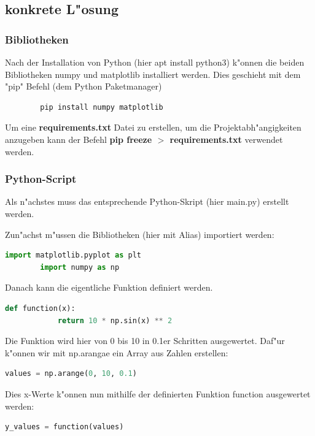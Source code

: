 \documentclass[a4paper,11pt,titlepage]{article}
\begin{document}
    \subsection{konkrete L"osung}

    \subsubsection{Bibliotheken}
    Nach der Installation von Python (hier apt install python3) k"onnen die beiden Bibliotheken numpy und matplotlib installiert werden. Dies geschieht mit dem "pip" Befehl (dem Python Paketmanager)
    \begin{lstlisting}
        pip install numpy matplotlib
    \end{lstlisting}
    Um eine \textbf{requirements.txt} Datei zu erstellen, um die Projektabh"angigkeiten anzugeben kann der Befehl \textbf{pip freeze $>$ requirements.txt} verwendet werden.

    \subsubsection{Python-Script}
    Als n"achstes muss das entsprechende Python-Skript (hier main.py) erstellt werden.

    Zun"achst m"ussen die Bibliotheken (hier mit Alias) importiert werden:
    \begin{lstlisting}[language=Python]
        import matplotlib.pyplot as plt
        import numpy as np
    \end{lstlisting}
    Danach kann die eigentliche Funktion definiert werden.
    \begin{lstlisting}[language=Python]
        def function(x):
            return 10 * np.sin(x) ** 2
    \end{lstlisting}
    Die Funktion wird hier von 0 bis 10 in 0.1er Schritten ausgewertet. Daf"ur k"onnen wir mit np.arangae ein Array aus Zahlen erstellen:
    \begin{lstlisting}[language=Python]
        values = np.arange(0, 10, 0.1)
    \end{lstlisting}
    Dies x-Werte k"onnen nun mithilfe der definierten Funktion function ausgewertet werden:
    \begin{lstlisting}[language=Python]
        y_values = function(values)
    \end{lstlisting}
\end{document}
